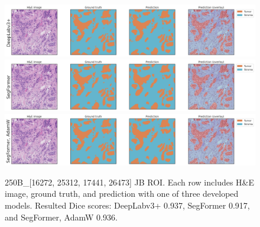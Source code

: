\begin{figure}[H]
\includegraphics[width=\linewidth]{figures/tissue/deeplabv3+_dice_s_250B_[16272,_25312,_17441,_26473]_nice.png}
\includegraphics[width=\linewidth]{figures/tissue/segformer_dice_s_250B_[16272,_25312,_17441,_26473]_nice.png}
\includegraphics[width=\linewidth]{figures/tissue/segformer,_adamw_dice_s_250B_[16272,_25312,_17441,_26473]_nice.png}

\caption{250B\_[16272, 25312, 17441, 26473] JB ROI. 
Each row includes H\&E image, ground truth, and prediction with one of three developed models.
Resulted Dice scores: DeepLabv3+ 0.937, SegFormer 0.917, and SegFormer, AdamW 0.936.}
\label{fig:s_250B_1}
\end{figure}

